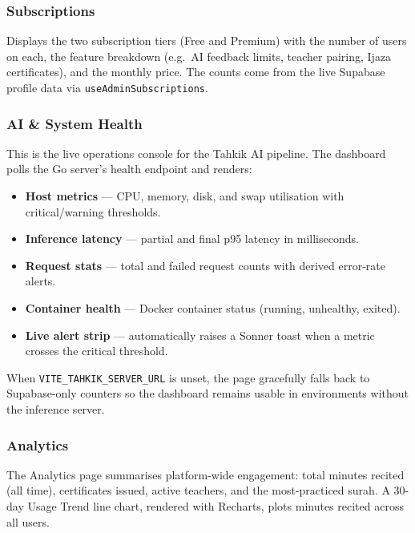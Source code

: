 \subsubsection{Subscriptions}

Displays the two subscription tiers (Free and Premium) with the number of users on each, the feature breakdown (e.g.\ AI feedback limits, teacher pairing, Ijaza certificates), and the monthly price. The counts come from the live Supabase profile data via \texttt{useAdminSubscriptions}.


\subsubsection{AI \& System Health}

This is the live operations console for the Tahkik AI pipeline. The dashboard polls the Go server's health endpoint and renders:
\begin{itemize}[leftmargin=2em]
  \item \textbf{Host metrics} --- CPU, memory, disk, and swap utilisation with critical/warning thresholds.
  \item \textbf{Inference latency} --- partial and final p95 latency in milliseconds.
  \item \textbf{Request stats} --- total and failed request counts with derived error-rate alerts.
  \item \textbf{Container health} --- Docker container status (running, unhealthy, exited).
  \item \textbf{Live alert strip} --- automatically raises a Sonner toast when a metric crosses the critical threshold.
\end{itemize}

When \texttt{VITE\_TAHKIK\_SERVER\_URL} is unset, the page gracefully falls back to Supabase-only counters so the dashboard remains usable in environments without the inference server.


\subsubsection{Analytics}

The Analytics page summarises platform-wide engagement: total minutes recited (all time), certificates issued, active teachers, and the most-practiced surah. A 30-day Usage Trend line chart, rendered with Recharts, plots minutes recited across all users.

